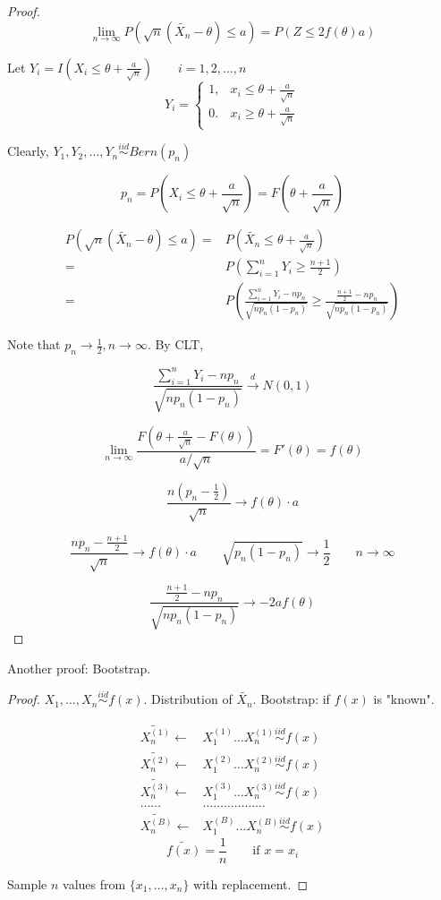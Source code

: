 \begin{proof}
\[\lim_{n \to\infty} P(\sqrt{n}(\tilde{X_n}-\theta)\leq a)=P(Z \leq 2 f(\theta)a)\]

Let $Y_i=I\left(X_i\leq \theta+\frac{a}{\sqrt{n}}\right) \qquad i=1,2,\dots,n$
\[Y_i=\begin{cases}
1, & x_i\leq \theta+\frac{a}{\sqrt{n}} \\
0. & x_i\geq \theta+\frac{a}{\sqrt{n}} 
\end{cases}\]

Clearly, $Y_1,Y_2,\dots,Y_n \overset{iid}{\sim} Bern(p_n)$

\[p_n=P\left(X_i\leq \theta+\frac{a}{\sqrt{n}}\right)=F\left( \theta+\frac{a}{\sqrt{n}}\right)\]

\begin{align*}
P(\sqrt{n}(\tilde{X_n}-\theta)\leq a)= & P\left(\tilde{X_n}\leq \theta+\frac{a}{\sqrt{n}}\right)\\
= & P\left( \sum_{i=1}^{n} Y_i \geq \frac{n+1}{2} \right) \\
= & P\left(\frac{\sum_{i=1}^{n} Y_i -n p_n}{\sqrt{n p_n(1-p_n)}} \geq \frac{\frac{n+1}{2} -n p_n}{\sqrt{n p_n(1-p_n)}}\right)
\end{align*}

Note that $p_n \to\frac{1}{2}, n\to \infty$. By CLT,

\[ \frac{\sum_{i=1}^{n} Y_i -n p_n}{\sqrt{n p_n(1-p_n)}}  \overset{d}{\to} N(0,1)\]

\[\lim_{n\to\infty} \frac{F\left(\theta+\frac{a}{\sqrt{n}}-F(\theta)\right)}{a/\sqrt{n}}=F'(\theta)=f(\theta)\]

\[\frac{n\left(p_n-\frac{1}{2}\right)}{\sqrt{n}} \longrightarrow f(\theta)\cdot a\]

\[\frac{np_n-\frac{n+1}{2}}{\sqrt{n}} \longrightarrow f(\theta)\cdot a \qquad \sqrt{p_n(1-p_n)} \longrightarrow \frac{1}{2} \qquad n\to\infty\]

\[\frac{\frac{n+1}{2} -n p_n}{\sqrt{n p_n(1-p_n)}}\longrightarrow -2af(\theta)\]
\end{proof}

Another proof: Bootstrap.
\begin{proof}
$X_1,\dots,X_n \overset{iid}{\sim} f(x)$. Distribution of $\tilde{X_n}$. Bootstrap: if $f(x)$ is "known".

\begin{align*}
\tilde{X_n^{(1)}} \leftarrow & X_1^{(1)} \dots X_n^{(1)} \overset{iid}{\sim} f(x)  \\
\tilde{X_n^{(2)}} \leftarrow & X_1^{(2)} \dots X_n^{(2)} \overset{iid}{\sim} f(x)  \\
\tilde{X_n^{(3)}} \leftarrow & X_1^{(3)} \dots X_n^{(3)} \overset{iid}{\sim} f(x)  \\
\dots\dots & \dots\dots\dots\dots\dots\dots \\
\tilde{X_n^{(B)}} \leftarrow & X_1^{(B)} \dots X_n^{(B)} \overset{iid}{\sim} f(x)  
\end{align*}
\[\tilde{f(x)}=\frac{1}{n} \qquad \text{if } x=x_i\]

Sample $n$ values from $\{x_1,\dots,x_n\}$ with replacement.
\end{proof}